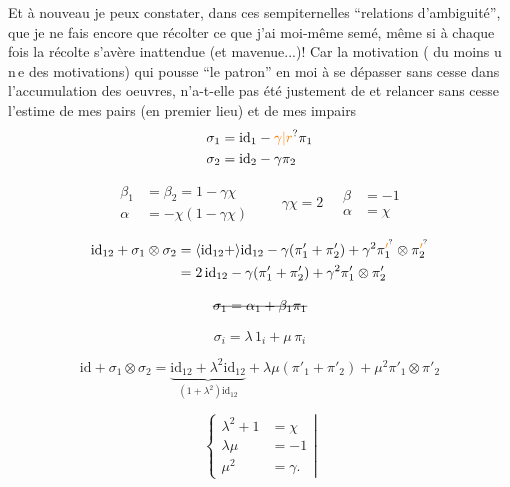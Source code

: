 Et à nouveau je peux constater, dans ces sempiternelles ``relations d'ambiguité'', que je ne fais encore que récolter ce que j'ai moi-même semé, même si à chaque fois la récolte s'avère inattendue (et mavenue...)! Car la motivation ( du moins u\,n\,e des motivations) qui pousse ``le patron'' en moi à se dépasser sans cesse dans l'accumulation des oeuvres, n'a-t-elle pas été justement de  et relancer sans cesse l'estime de mes pairs (en premier lieu) et de mes impairs
\[
\begin{aligned}
\sigma_1&=\mathrm{id}_1-\unsure{\gamma|r}\pi_1\\
\sigma_2&=\mathrm{id}_2-\gamma\pi_2
\end{aligned}
\]

\[
\begin{aligned}\beta_1&=\beta_2=1-\gamma\chi\\
\alpha&=-\chi(1-\gamma\chi)\end{aligned}
\qquad
\boxed{\gamma\chi=2}\quad
\boxed{\begin{aligned}\beta&=-1\\\alpha&=\chi\end{aligned}}
\]

\[
\begin{aligned}
\mathrm{id}_{12}+\sigma_1\otimes\sigma_2
 &=\inserted{\mathrm{id}_{12}+}\mathrm{id}_{12}-\gamma(\pi'_1+\pi'_2)+\gamma^2\pi_1^{\unsure{\prime}}\otimes\pi_2^{\unsure{\prime}}\\
 &=2\,\mathrm{id}_{12}-\gamma(\pi'_1+\pi'_2)+\gamma^2\pi'_1\otimes\pi'_2
\end{aligned}
\]

\[\deleted{\sigma_1=\alpha_1+\beta_1\pi_1}\]

\[\sigma_i=\lambda\,1_i+\mu\,\pi_i\]

\[
\mathrm{id}+\sigma_1\otimes\sigma_2=
\underbrace{\mathrm{id}_{12}+\lambda^2\mathrm{id}_{12}}_{(1+\lambda^2)\mathrm{id}_{12}}
+\lambda\mu(\pi'_1+\pi'_2)+\mu^2\pi'_1\otimes\pi'_2
\]

\[
\left\{\begin{aligned}\lambda^2+1&=\chi\\
\lambda\mu&=-1\\
\mu^2&=\gamma.\end{aligned}\right|
\]

